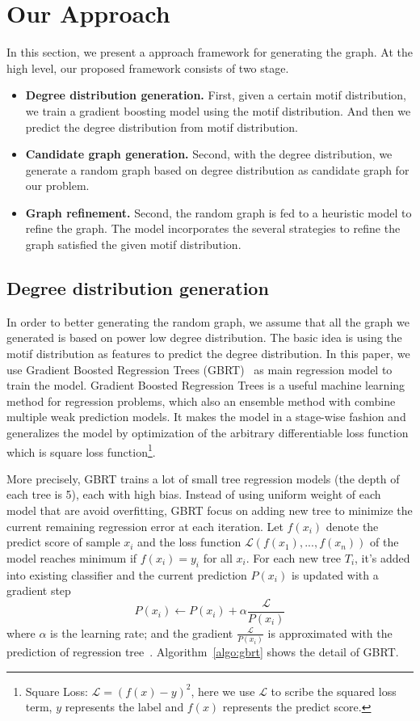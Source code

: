 \section{Our Approach}
\label{sec:approach}

In this section, we present a approach framework for generating the graph. At the high level, our proposed framework consists of two stage.
\begin{itemize}
    \item {\bf Degree distribution generation.} First, given a certain motif distribution, we train a gradient boosting model using the motif distribution. And then we predict the degree distribution from motif distribution.
    \item {\bf Candidate graph generation.} Second, with the degree distribution, we generate a random graph based on degree distribution as candidate graph for our problem.
    \item {\bf Graph refinement.} Second, the random graph is fed to a heuristic model to refine the graph. The model incorporates the several strategies to refine the graph satisfied the given motif distribution.
\end{itemize}

\subsection{Degree distribution generation} 

In order to better generating the random graph, we assume that all the graph we generated is based on power low degree distribution. The basic idea is using the motif distribution as features to predict the degree distribution. In this paper, we use Gradient Boosted Regression Trees (GBRT)~\cite{friedman2002stochastic} as main regression model to train the model. Gradient Boosted Regression Trees is a useful machine learning method for regression problems, which also an ensemble method with combine multiple weak prediction models. It makes the model in a stage-wise fashion and generalizes the model by optimization of the arbitrary differentiable loss function which is square loss function\footnote{Square Loss: $\mathcal{L} = (f(x) - y)^2$, here we use $\mathcal{L}$ to scribe the squared loss term, $y$ represents the label and $f(x)$ represents the predict score.}. 

More precisely, GBRT trains a lot of small tree regression models (the depth of each tree is 5), each with high bias. Instead of using uniform weight of each model that are avoid overfitting, GBRT focus on adding new tree to minimize the current remaining regression error at each iteration. Let $f(x_i)$ denote the predict score of sample $x_i$ and the loss function $\mathcal{L}(f(x_1),...,f(x_n))$ of the model reaches minimum if $f(x_i) = y_i$ for all $x_i$. For each new tree $T_i$, it's added into existing classifier and the current prediction $P(x_i)$ is updated with a gradient step
$$P(x_i) \leftarrow P(x_i) + \alpha \frac{\mathcal{L}}{P(x_i)}$$
\noindent where $\alpha$ is the learning rate; and the gradient $\frac{\mathcal{L}}{P(x_i)}$ is approximated with the prediction of regression tree~\cite{zheng2007general}. Algorithm~\ref{algo:gbrt} shows the detail of GBRT.

